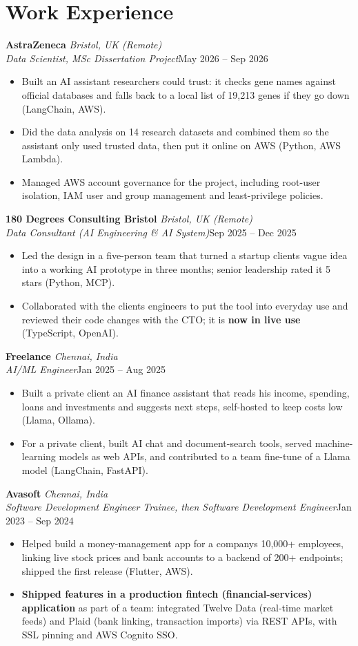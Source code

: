 \documentclass[a4paper,11pt]{article}
\newcommand{\role}[4]{%
  \textbf{#1}{\color{muted}\,\textperiodcentered\,\textit{#2}}\\
  \textit{#4}\hfill{\color{muted}#3}\par}
\newcommand{\gap}{\vspace{5pt}}
\newcommand{\num}[1]{\textbf{#1}}   %
\begin{document}
\section{Work Experience}
\role{AstraZeneca}{Bristol, UK (Remote)}{May 2026 – Sep 2026}{Data Scientist, MSc Dissertation Project}
\begin{itemize}
  \item Built an AI assistant researchers could trust: it checks gene names against official databases and falls back to a local list of 19,213 genes if they go down (LangChain, AWS).
  \item Did the data analysis on 14 research datasets and combined them so the assistant only used trusted data, then put it online on AWS (Python, AWS Lambda).
  \item Managed AWS account governance for the project, including root-user isolation, IAM user and group management and least-privilege policies.
\end{itemize}
\gap
{}
\role{180 Degrees Consulting Bristol}{Bristol, UK (Remote)}{Sep 2025 – Dec 2025}{Data Consultant (AI Engineering \& AI System)}
\begin{itemize}
  \item Led the design in a five-person team that turned a startup client\textquotesingle{}s vague idea into a working AI prototype in three months; senior leadership rated it 5 stars (Python, MCP).
  \item Collaborated with the client\textquotesingle{}s engineers to put the tool into everyday use and reviewed their code changes with the CTO; it is \num{now in live use} (TypeScript, OpenAI).
\end{itemize}
\gap
{}
\role{Freelance}{Chennai, India}{Jan 2025 – Aug 2025}{AI/ML Engineer}
\begin{itemize}
  \item Built a private client an AI finance assistant that reads his income, spending, loans and investments and suggests next steps, self-hosted to keep costs low (Llama, Ollama).
  \item For a private client, built AI chat and document-search tools, served machine-learning models as web APIs, and contributed to a team fine-tune of a Llama model (LangChain, FastAPI).
\end{itemize}
\gap
{}
\role{Avasoft}{Chennai, India}{Jan 2023 – Sep 2024}{Software Development Engineer Trainee, then Software Development Engineer}
\begin{itemize}
  \item Helped build a money-management app for a company\textquotesingle{}s 10,000+ employees, linking live stock prices and bank accounts to a backend of 200+ endpoints; shipped the first release (Flutter, AWS).
  \item \num{Shipped features in a production fintech (financial-services) application} as part of a team: integrated Twelve Data (real-time market feeds) and Plaid (bank linking, transaction imports) via REST APIs, with SSL pinning and AWS Cognito SSO.
\end{itemize}
\end{document}
